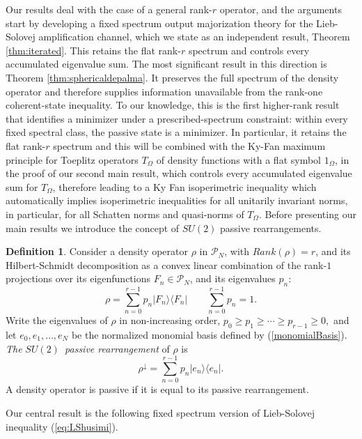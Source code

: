\documentclass[12pt]{amsart}
\theoremstyle{plain}
\theoremstyle{definition}
\newtheorem{definition}[theorem]{Definition}
\theoremstyle{remark}
\numberwithin{equation}{section}
\newcommand{\1}{\mathbf 1}
\begin{document}
Our results deal with the case of a general rank-$r$ operator, and the
arguments start by developing a fixed spectrum output majorization theory
for the Lieb-Solovej amplification channel, which we state as an independent
result, Theorem \ref{thm:iterated}. This retains the flat rank-$r$ spectrum
and controls every accumulated eigenvalue sum. The most significant result
in this direction is Theorem \ref{thm:sphericaldepalma}. It preserves the
full spectrum of the density operator and therefore supplies information
unavailable from the rank-one coherent-state inequality. To our knowledge,
this is the first higher-rank result that identifies a minimizer under a
prescribed-spectrum constraint: within every fixed spectral class, the
passive state is a minimizer. In particular, it retains the flat rank-$r$
spectrum and this will be combined with the Ky-Fan maximum principle for
Toeplitz operators $T_{\Omega }$ of density functions with a flat symbol $%
1_{\Omega }$, in the proof of our second main result, which controls every
accumulated eigenvalue sum for $T_{\Omega }$, therefore leading to a Ky Fan
isoperimetric inequality which automatically implies isoperimetric
inequalities for all unitarily invariant norms, in particular, for all
Schatten norms and quasi-norms of $T_{\Omega }$. Before presenting our main
results we introduce the concept of $SU(2)$ passive rearrangements.

\begin{definition}
Consider a density operator $\rho $ in $\mathcal{P}_{N}$, with $Rank(\rho )=r
$, and its Hilbert-Schmidt decomposition as a convex linear combination of
the rank-$1$ projections over its eigenfunctions $F_{n}\in \mathcal{P}_{N}$,
and its eigenvalues $p_{n}$: 
\begin{equation*}
\rho =\sum_{n=0}^{r-1}p_{n}|F_{n}\rangle \langle F_{n}|\qquad
\sum_{n=0}^{r-1}p_{n}=1.
\end{equation*}%
Write the eigenvalues of $\rho $ in non-increasing order, $p_{0}\geq
p_{1}\geq \cdots \geq p_{r-1}\geq 0,$ and let $e_{0},e_{1},\ldots ,e_{N}$ be
the normalized monomial basis defined by (\ref{monomialBasis}). \emph{The }$%
SU(2)$\emph{\ passive rearrangement} of $\rho $ is 
\begin{equation*}
\rho ^{\downarrow }=\sum_{n=0}^{r-1}p_{n}|e_{n}\rangle \langle e_{n}|.
\end{equation*}%
A density operator is passive if it is equal to its passive rearrangement.
\end{definition}

Our central result is the following fixed spectrum version of Lieb-Solovej
inequality (\ref{eq:LShusimi}).
\end{document}
